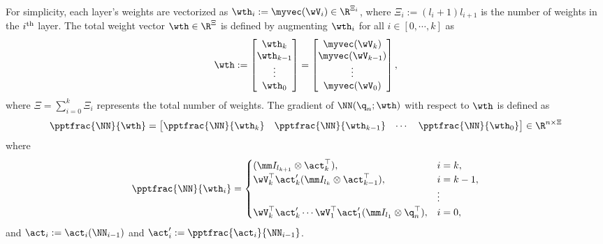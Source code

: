 \documentclass[final,5p,times,twocolumn,authoryear]{elsarticle}
\begin{document}
For simplicity, each layer's weights are vectorized as $\wth_i:=\myvec(\wV_i)\in\R^{\Xi_i}$, where $\Xi_i:= (l_i+1)l_{i+1}$ is the number of weights in the $i\textsuperscript{th}$ layer. 
The total weight vector $\wth\in\R^{\Xi}$ is defined by augmenting $\wth_i$ for all $i\in [0,\cdots,k]$ as 
\begin{equation}
    \wth := 
    \begin{bmatrix}
        \wth_k\\
        \wth_{k-1}\\
        \vdots\\
        \wth_0
    \end{bmatrix}
    =
    \begin{bmatrix}
        \myvec(\wV_k)\\
        \myvec(\wV_{k-1})\\
        \vdots\\
        \myvec(\wV_0)
    \end{bmatrix},
\end{equation}
where $\Xi={\sum_{i=0}^{k} \Xi_i}$ represents the total number of weights. The gradient of $ \NN({\q}_n;\wth)$ with respect to $\wth$ is defined as
\begin{equation}
    \pptfrac{\NN}{\wth}=
    \begin{bmatrix}
        \pptfrac{\NN}{\wth_k}&
        \pptfrac{\NN}{\wth_{k-1}}&
    \cdots &
        \pptfrac{\NN}{\wth_0}
    \end{bmatrix}
    \in\R^{n \times \Xi}
    \label{eq. nabla phi}
\end{equation}
where
\begin{equation}
    \pptfrac{\NN}{\wth_i} = 
    \begin{cases}
        (
            \mm I_{l_{k+1}}
            \otimes 
            \act_{k}^\top  
        )
        , 
        &
        i=k
        ,
        \\
        \wV_k^\top\act_{k}' 
        (
            \mm I_{l_{k}}
            \otimes  
            \act_{k-1}^\top  
        )
        , 
        & 
        i=k-1
        ,
        \\
        &
        \vdots 
        \\
        \wV_k^\top\act'_{k} 
        \cdots 
        \wV_1^\top\act_1' 
        (
            \mm I_{l_1}
            \otimes 
            {\q}_n^\top  
        )
        , 
        &
        i = 0
        ,
    \end{cases}
    \label{eq:NN:grad}
\end{equation}
and $\act_i:= \act_i(\NN_{i-1})$ and $\act_i':= \pptfrac{\act_i}{\NN_{i-1}}$.
\end{document}
